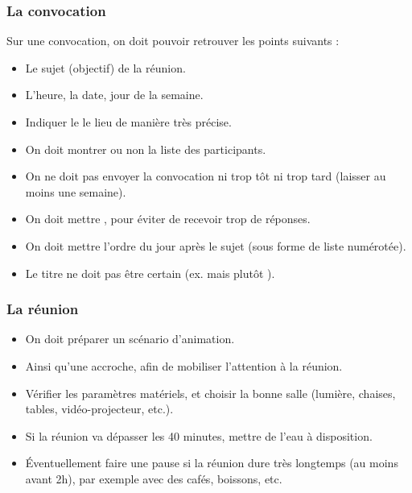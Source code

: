 \subsubsection{La convocation}
Sur une convocation, on doit pouvoir retrouver les points suivants :
\begin{itemize}
    \item Le sujet (objectif) de la réunion.
    \item L'heure, la date, jour de la semaine.
    \item Indiquer le le lieu de manière très précise.
    \item On doit montrer ou non la liste des participants.
    \item On ne doit pas envoyer la convocation ni trop tôt ni trop tard (laisser au moins une semaine).
    \item On doit mettre , pour éviter de recevoir trop de réponses.
    \item On doit mettre l'ordre du jour après le sujet (sous forme de liste numérotée).
    \item Le titre ne doit pas être certain (ex.  mais plutôt ).
\end{itemize}

\subsubsection{La réunion}
\begin{itemize}
    \item On doit préparer un scénario d'animation.
    \item Ainsi qu'une accroche, afin de mobiliser l'attention à la réunion.
    \item Vérifier les paramètres matériels, et choisir la bonne salle (lumière, chaises, tables, vidéo-projecteur, etc.).
    \item Si la réunion va dépasser les 40 minutes, mettre de l'eau à disposition.
    \item Éventuellement faire une pause si la réunion dure très longtemps (au moins avant 2h), par exemple avec des cafés, boissons, etc.
\end{itemize}
